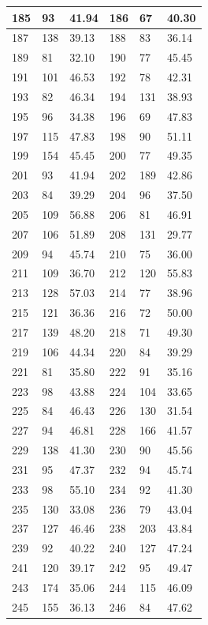 \documentclass[10.9pt]{article} %
\begin{document}
{\begin{longtable}{|p{2cm}|p{2cm}|p{2cm}|p{2cm}|p{2cm}|p{2cm}|}
\hline
185 & 93& 41.94 & 186 & 67& 40.30\\
\hline
187 & 138& 39.13 & 188 & 83& 36.14\\
\hline
189 & 81& 32.10 & 190 & 77& 45.45\\
\hline
191 & 101& 46.53 & 192 & 78& 42.31\\
\hline
193 & 82& 46.34 & 194 & 131& 38.93\\
\hline
195 & 96& 34.38 & 196 & 69& 47.83\\
\hline
197 & 115& 47.83 & 198 & 90& 51.11\\
\hline
199 & 154& 45.45 & 200 & 77& 49.35\\
\hline
201 & 93& 41.94 & 202 & 189& 42.86\\
\hline
203 & 84& 39.29 & 204 & 96& 37.50\\
\hline
205 & 109& 56.88 & 206 & 81& 46.91\\
\hline
207 & 106& 51.89 & 208 & 131& 29.77\\
\hline
209 & 94& 45.74 & 210 & 75& 36.00\\
\hline
211 & 109& 36.70 & 212 & 120& 55.83\\
\hline
213 & 128& 57.03 & 214 & 77& 38.96\\
\hline
215 & 121& 36.36 & 216 & 72& 50.00\\
\hline
217 & 139& 48.20 & 218 & 71& 49.30\\
\hline
219 & 106& 44.34 & 220 & 84& 39.29\\
\hline
221 & 81& 35.80 & 222 & 91& 35.16\\
\hline
223 & 98& 43.88 & 224 & 104& 33.65\\
\hline
225 & 84& 46.43 & 226 & 130& 31.54\\
\hline
227 & 94& 46.81 & 228 & 166& 41.57\\
\hline
229 & 138& 41.30 & 230 & 90& 45.56\\
\hline
231 & 95& 47.37 & 232 & 94& 45.74\\
\hline
233 & 98& 55.10 & 234 & 92& 41.30\\
\hline
235 & 130& 33.08 & 236 & 79& 43.04\\
\hline
237 & 127& 46.46 & 238 & 203& 43.84\\
\hline
239 & 92& 40.22 & 240 & 127& 47.24\\
\hline
241 & 120& 39.17 & 242 & 95& 49.47\\
\hline
243 & 174& 35.06 & 244 & 115& 46.09\\
\hline
245 & 155& 36.13 & 246 & 84& 47.62\\

\end{longtable}}
\end{document}
